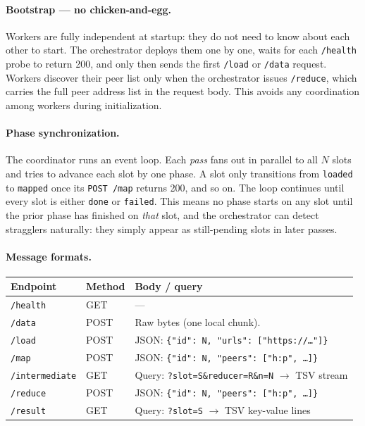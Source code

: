 \documentclass[11pt,a4paper]{article}
\begin{document}
\paragraph{Bootstrap — no chicken-and-egg.}
Workers are fully independent at startup: they do not need to know about each
other to start. The orchestrator deploys them one by one, waits for each
\texttt{/health} probe to return 200, and only then sends the first \texttt{/load}
or \texttt{/data} request. Workers discover their peer list only when the
orchestrator issues \texttt{/reduce}, which carries the full peer address list in
the request body. This avoids any coordination among workers during
initialization.

\paragraph{Phase synchronization.}
The coordinator runs an event loop. Each \emph{pass} fans out in parallel to all
\(N\) slots and tries to advance each slot by one phase. A slot only transitions
from \texttt{loaded} to \texttt{mapped} once its \texttt{POST /map} returns 200,
and so on. The loop continues until every slot is either \texttt{done} or
\texttt{failed}. This means no phase starts on any slot until the prior phase has
finished on \emph{that} slot, and the orchestrator can detect stragglers
naturally: they simply appear as still-pending slots in later passes.

\paragraph{Message formats.}

\begin{center}\small
\begin{tabular}{p{2.8cm} p{2.2cm} p{8.5cm}}
\toprule
\textbf{Endpoint} & \textbf{Method} & \textbf{Body / query} \\
\midrule
\texttt{/health}       & GET  & — \\
\texttt{/data}         & POST & Raw bytes (one local chunk). \\
\texttt{/load}         & POST & JSON: \texttt{\{"id": N, "urls": ["https://…"]\}} \\
\texttt{/map}          & POST & JSON: \texttt{\{"id": N, "peers": ["h:p", …]\}} \\
\texttt{/intermediate} & GET  & Query: \texttt{?slot=S\&reducer=R\&n=N} $\to$ TSV stream \\
\texttt{/reduce}       & POST & JSON: \texttt{\{"id": N, "peers": ["h:p", …]\}} \\
\texttt{/result}       & GET  & Query: \texttt{?slot=S} $\to$ TSV key-value lines \\
\bottomrule
\end{tabular}
\end{center}
\end{document}
